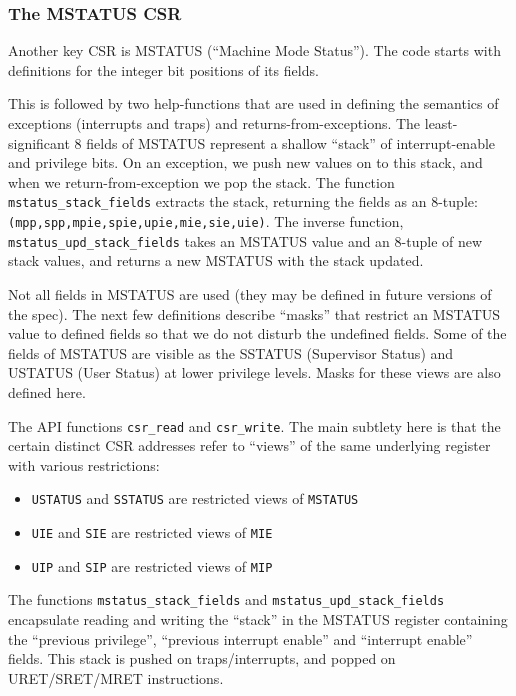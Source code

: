 \documentclass[11pt]{article}
\begin{document}

\subsubsection{The MSTATUS CSR}

Another key CSR is MSTATUS (``Machine Mode Status'').  The code starts
with definitions for the integer bit positions of its fields.

This is followed by two help-functions that are used in defining the
semantics of exceptions (interrupts and traps) and
returns-from-exceptions.  The least-significant 8 fields of MSTATUS
represent a shallow ``stack'' of interrupt-enable and privilege
bits. On an exception, we push new values on to this stack, and when
we return-from-exception we pop the stack. The function
\verb|mstatus_stack_fields| extracts the stack, returning the fields
as an 8-tuple: \verb|(mpp,spp,mpie,spie,upie,mie,sie,uie)|.  The
inverse function, \verb|mstatus_upd_stack_fields| takes an MSTATUS
value and an 8-tuple of new stack values, and returns a new MSTATUS
with the stack updated.

Not all fields in MSTATUS are used (they may be defined in future
versions of the spec).  The next few definitions describe ``masks''
that restrict an MSTATUS value to defined fields so that we do not
disturb the undefined fields.  Some of the fields of MSTATUS are
visible as the SSTATUS (Supervisor Status) and USTATUS (User Status)
at lower privilege levels.  Masks for these views are also defined
here.

The API functions \verb|csr_read| and \verb|csr_write|.  The main
subtlety here is that the certain distinct CSR addresses refer to
``views'' of the same underlying register with various restrictions:

\begin{itemize}
\item
\verb|USTATUS| and \verb|SSTATUS| are restricted views of \verb|MSTATUS|

\item
\verb|UIE| and \verb|SIE| are restricted views of \verb|MIE|

\item
\verb|UIP| and \verb|SIP| are restricted views of \verb|MIP|
\end{itemize}


The functions \verb|mstatus_stack_fields| and
\verb|mstatus_upd_stack_fields| encapsulate reading and writing the
``stack'' in the MSTATUS register containing the ``previous
privilege'', ``previous interrupt enable'' and ``interrupt enable''
fields.  This stack is pushed on traps/interrupts, and popped on
URET/SRET/MRET instructions.
\end{document}
